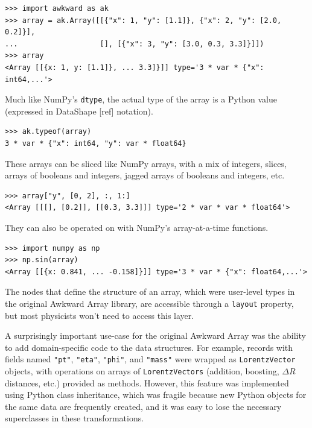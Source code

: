 \documentclass{webofc}
\begin{document}
\begin{verbatim}
>>> import awkward as ak
>>> array = ak.Array([[{"x": 1, "y": [1.1]}, {"x": 2, "y": [2.0, 0.2]}],
...                   [], [{"x": 3, "y": [3.0, 0.3, 3.3]}]])
>>> array
<Array [[{x: 1, y: [1.1]}, ... 3.3]}]] type='3 * var * {"x": int64,...'>
\end{verbatim}

\noindent Much like NumPy's \texttt{dtype}, the actual type of the array is a Python value (expressed in DataShape [ref] notation).

\begin{verbatim}
>>> ak.typeof(array)
3 * var * {"x": int64, "y": var * float64}
\end{verbatim}

\noindent These arrays can be sliced like NumPy arrays, with a mix of integers, slices, arrays of booleans and integers, jagged arrays of booleans and integers, etc.

\begin{verbatim}
>>> array["y", [0, 2], :, 1:]
<Array [[[], [0.2]], [[0.3, 3.3]]] type='2 * var * var * float64'>
\end{verbatim}

\noindent They can also be operated on with NumPy's array-at-a-time functions.

\begin{verbatim}
>>> import numpy as np
>>> np.sin(array)
<Array [[{x: 0.841, ... -0.158]}]] type='3 * var * {"x": float64,...'>
\end{verbatim}

The nodes that define the structure of an array, which were user-level types in the original Awkward Array library, are accessible through a \texttt{layout} property, but most physicists won't need to access this layer.

A surprisingly important use-case for the original Awkward Array was the ability to add domain-specific code to the data structures. For example, records with fields named \texttt{"pt"}, \texttt{"eta"}, \texttt{"phi"}, and \texttt{"mass"} were wrapped as \texttt{LorentzVector} objects, with operations on arrays of \texttt{LorentzVectors} (addition, boosting, $\Delta R$ distances, etc.) provided as methods. However, this feature was implemented using Python class inheritance, which was fragile because new Python objects for the same data are frequently created, and it was easy to lose the necessary superclasses in these transformations.
\end{document}
